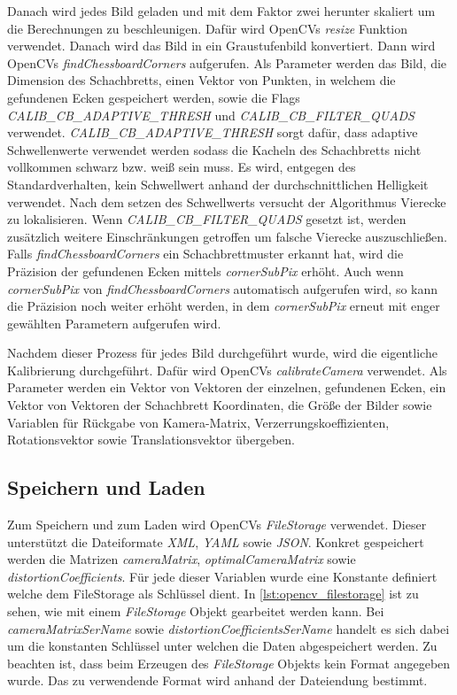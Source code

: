 Danach wird jedes Bild geladen und mit dem Faktor zwei herunter skaliert um die Berechnungen zu beschleunigen.
Dafür wird OpenCVs \emph{resize}\cite{opencv_doc_resize} Funktion verwendet.
Danach wird das Bild in ein Graustufenbild konvertiert\cite{opencv_doc_cvt_color}.
Dann wird OpenCVs \emph{findChessboardCorners}\cite{opencv_doc_find_chessboard_corners} aufgerufen.
Als Parameter werden das Bild, die Dimension des Schachbretts, einen Vektor von Punkten, in welchem die gefundenen Ecken gespeichert werden, sowie die Flags \emph{CALIB\_CB\_ADAPTIVE\_THRESH} und \emph{CALIB\_CB\_FILTER\_QUADS} verwendet.
\sloppy
\emph{CALIB\_CB\_ADAPTIVE\_THRESH} sorgt dafür, dass adaptive Schwellenwerte verwendet werden sodass die Kacheln des Schachbretts nicht vollkommen schwarz bzw. weiß sein muss.
Es wird, entgegen des Standardverhalten, kein Schwellwert anhand der durchschnittlichen Helligkeit verwendet\cite{opencv_doc_find_chessboard_corners}.
Nach dem setzen des Schwellwerts versucht der Algorithmus Vierecke zu lokalisieren.
Wenn \emph{CALIB\_CB\_FILTER\_QUADS} gesetzt ist, werden zusätzlich weitere Einschränkungen getroffen um falsche Vierecke auszuschließen\cite{opencv_doc_find_chessboard_corners}.
Falls \emph{findChessboardCorners} ein Schachbrettmuster erkannt hat, wird die Präzision der gefundenen Ecken mittels \emph{cornerSubPix}\cite{opencv_doc_corner_sub_pix} erhöht.
Auch wenn \emph{cornerSubPix} von \emph{findChessboardCorners} automatisch aufgerufen wird, so kann die Präzision noch weiter erhöht werden, in dem \emph{cornerSubPix} erneut mit enger gewählten Parametern aufgerufen wird.

Nachdem dieser Prozess für jedes Bild durchgeführt wurde, wird die eigentliche Kalibrierung durchgeführt.
Dafür wird OpenCVs \emph{calibrateCamera}\cite{opencv_doc_calibrate_camera} verwendet.
Als Parameter werden ein Vektor von Vektoren der einzelnen, gefundenen Ecken, ein Vektor von Vektoren der Schachbrett Koordinaten, die Größe der Bilder sowie Variablen für Rückgabe von Kamera-Matrix, Verzerrungskoeffizienten, Rotationsvektor sowie Translationsvektor übergeben.



\subsection{Speichern und Laden}\label{sec:calibration-load-save}
Zum Speichern und zum Laden wird OpenCVs \emph{FileStorage}\cite{opencv_doc_file_storage} verwendet.
Dieser unterstützt die Dateiformate \emph{XML}, \emph{YAML} sowie \emph{JSON}.
Konkret gespeichert werden die Matrizen \emph{cameraMatrix}, \emph{optimalCameraMatrix} sowie \emph{distortionCoefficients}.
Für jede dieser Variablen wurde eine Konstante definiert welche dem FileStorage als Schlüssel dient.
In \autoref{lst:opencv_filestorage} ist zu sehen, wie mit einem \emph{FileStorage} Objekt gearbeitet werden kann.
Bei \emph{cameraMatrixSerName} sowie \emph{distortionCoefficientsSerName} handelt es sich dabei um die konstanten Schlüssel unter welchen die Daten abgespeichert werden.
Zu beachten ist, dass beim Erzeugen des \emph{FileStorage} Objekts kein Format angegeben wurde.
Das zu verwendende Format wird anhand der Dateiendung bestimmt.

